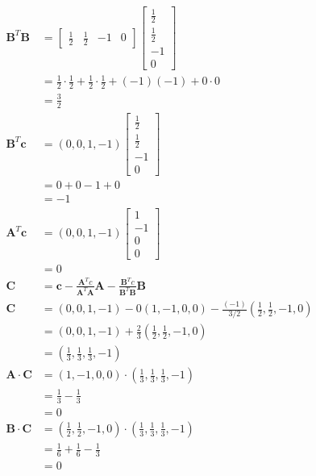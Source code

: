 \documentclass[main.tex]{subfiles}
\begin{document}
\begin{enumerate}
    $$
    \begin{aligned}
    \bm{B}^{T} \bm{B} &=\left[\begin{array}{llll}
    \frac{1}{2} & \frac{1}{2} & -1 & 0
    \end{array}\right]\left[\begin{array}{c}
    \frac{1}{2} \\
    \frac{1}{2} \\
    -1 \\
    0
    \end{array}\right] \\
    &=\frac{1}{2} \cdot \frac{1}{2}+\frac{1}{2} \cdot \frac{1}{2}+(-1)(-1)+0 \cdot 0 \\
    &=\frac{3}{2}\\
    \bm{B}^{T} \bm{c} &=(0,0,1,-1)\left[\begin{array}{c}
    \frac{1}{2} \\
    \frac{1}{2} \\
    -1 \\
    0
    \end{array}\right] \\
    &=0+0-1+0 \\
    &=-1 \\
    \bm{A}^{T} \bm{c} &=(0,0,1,-1)\left[\begin{array}{c}
    1 \\
    -1 \\
    0 \\
    0
    \end{array}\right] \\
    &=0\\
    \bm{C} &=\bm{c}-\frac{\bm{A}^{T} c}{\bm{A}^{T} \bm{A}} \bm{A}-\frac{\bm{B}^{T} c}{\bm{B}^{T} \bm{B}} \bm{B} \\
    \bm{C} &=(0,0,1,-1)-0(1,-1,0,0)-\frac{(-1)}{3 / 2}\left(\frac{1}{2}, \frac{1}{2},-1,0\right) \\
    &=(0,0,1,-1)+\frac{2}{3}\left(\frac{1}{2}, \frac{1}{2},-1,0\right) \\
    &=\left(\frac{1}{3}, \frac{1}{3}, \frac{1}{3},-1\right)\\
    \bm{A} \cdot \bm{C} &=(1,-1,0,0) \cdot\left(\frac{1}{3}, \frac{1}{3}, \frac{1}{3},-1\right) \\
    &=\frac{1}{3}-\frac{1}{3} \\
    &=0\\
    \bm{B} \cdot \bm{C} &=\left(\frac{1}{2}, \frac{1}{2},-1,0\right) \cdot\left(\frac{1}{3}, \frac{1}{3}, \frac{1}{3},-1\right) \\
    &=\frac{1}{6}+\frac{1}{6}-\frac{1}{3} \\
    &=0
    \end{aligned}
    $$
    

\end{enumerate}
\end{document}
